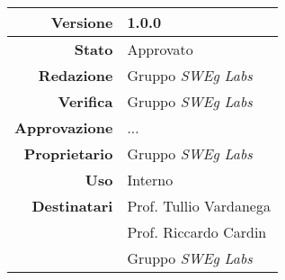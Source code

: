 \begin{center}
\begin{tabular}{r|l}
    \textbf{Versione} & 1.0.0 \\
    \hline
    \textbf{Stato} & Approvato \\
    \hline
    \textbf{Redazione} & Gruppo \emph{SWEg Labs} \\
    \hline
    \textbf{Verifica} & Gruppo \emph{SWEg Labs} \\
    \hline
    \textbf{Approvazione} & ... \\
    \hline
    \textbf{Proprietario} & Gruppo \emph{SWEg Labs} \\
    \hline
    \textbf{Uso} & Interno \\
    \hline
    \textbf{Destinatari} & Prof. Tullio Vardanega \\
                            & Prof. Riccardo Cardin \\
                            & Gruppo \emph{SWEg Labs} \\
\end{tabular}
\end{center}
    
